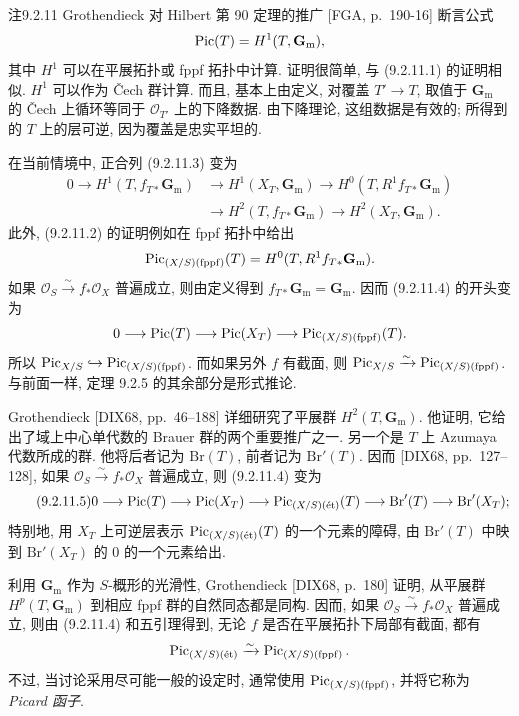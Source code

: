 \begin{origstatement}{注}{9.2.11}
Grothendieck 对 Hilbert 第 90 定理的推广 [FGA, p.~190-16] 断言公式
\[
\Pic(T)=H^1(T,\mathbf G_{\mathrm m}),
\]
其中 $H^1$ 可以在平展拓扑或 fppf 拓扑中计算. 证明很简单, 与 (9.2.11.1) 的证明相似. $H^1$ 可以作为 \v{C}ech 群计算. 而且, 基本上由定义, 对覆盖 $T'\to T$, 取值于 $\mathbf G_{\mathrm m}$ 的 \v{C}ech 上循环等同于 $\mathcal O_{T'}$ 上的下降数据. 由下降理论, 这组数据是有效的; 所得到的 $T$ 上的层可逆, 因为覆盖是忠实平坦的.

在当前情境中, 正合列 (9.2.11.3) 变为
\begin{equation}
\tag{9.2.11.4}\label{ch09s02:eq92114}
\begin{aligned}
0\longrightarrow H^1(T,f_{T*}\mathbf G_{\mathrm m})
&\longrightarrow H^1(X_T,\mathbf G_{\mathrm m})
\longrightarrow H^0(T,R^1f_{T*}\mathbf G_{\mathrm m})\\
&\longrightarrow H^2(T,f_{T*}\mathbf G_{\mathrm m})
\longrightarrow H^2(X_T,\mathbf G_{\mathrm m}).
\end{aligned}
\end{equation}
此外, (9.2.11.2) 的证明例如在 fppf 拓扑中给出
\[
\PF(T)=H^0(T,R^1f_{T*}\mathbf G_{\mathrm m}).
\]
如果 $\mathcal O_S\xrightarrow{\sim}f_*\mathcal O_X$ 普遍成立, 则由定义得到 $f_{T*}\mathbf G_{\mathrm m}=\mathbf G_{\mathrm m}$. 因而 (9.2.11.4) 的开头变为
\[
0\longrightarrow\Pic(T)\longrightarrow\Pic(X_T)\longrightarrow\PF(T).
\]
所以 $\Pic_{X/S}\hookrightarrow\PF$. 而如果另外 $f$ 有截面, 则 $\Pic_{X/S}\xrightarrow{\sim}\PF$. 与前面一样, 定理 9.2.5 的其余部分是形式推论.

Grothendieck [DIX68, pp.~46--188] 详细研究了平展群 $H^2(T,\mathbf G_{\mathrm m})$. 他证明, 它给出了域上中心单代数的 Brauer 群的两个重要推广之一. 另一个是 $T$ 上 Azumaya 代数所成的群. 他将后者记为 $\mathrm{Br}(T)$, 前者记为 $\mathrm{Br}'(T)$. 因而 [DIX68, pp.~127--128], 如果 $\mathcal O_S\xrightarrow{\sim}f_*\mathcal O_X$ 普遍成立, 则 (9.2.11.4) 变为
\begin{equation}
\tag{9.2.11.5}\label{ch09s02:eq92115}
0\longrightarrow\Pic(T)\longrightarrow\Pic(X_T)\longrightarrow\PE(T)
\longrightarrow\mathrm{Br}'(T)\longrightarrow\mathrm{Br}'(X_T);
\end{equation}
特别地, 用 $X_T$ 上可逆层表示 $\PE(T)$ 的一个元素的障碍, 由 $\mathrm{Br}'(T)$ 中映到 $\mathrm{Br}'(X_T)$ 的 $0$ 的一个元素给出.

利用 $\mathbf G_{\mathrm m}$ 作为 $S$-概形的光滑性, Grothendieck [DIX68, p.~180] 证明, 从平展群 $H^p(T,\mathbf G_{\mathrm m})$ 到相应 fppf 群的自然同态都是同构. 因而, 如果 $\mathcal O_S\xrightarrow{\sim}f_*\mathcal O_X$ 普遍成立, 则由 (9.2.11.4) 和五引理得到, 无论 $f$ 是否在平展拓扑下局部有截面, 都有
\[
\PE\xrightarrow{\sim}\PF.
\]
不过, 当讨论采用尽可能一般的设定时, 通常使用 $\PF$, 并将它称为 \emph{Picard 函子}.
\end{origstatement}

\endgroup
